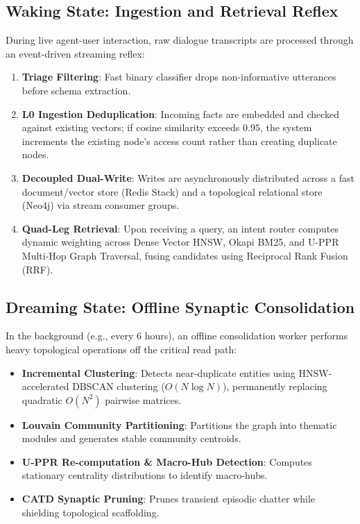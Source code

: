 \documentclass[conference]{IEEEtran}
\begin{document}
\subsection{Waking State: Ingestion and Retrieval Reflex}
During live agent-user interaction, raw dialogue transcripts are processed through an event-driven streaming reflex:
\begin{enumerate}
    \item \textbf{Triage Filtering}: Fast binary classifier drops non-informative utterances before schema extraction.
    \item \textbf{L0 Ingestion Deduplication}: Incoming facts are embedded and checked against existing vectors; if cosine similarity exceeds $0.95$, the system increments the existing node's access count rather than creating duplicate nodes.
    \item \textbf{Decoupled Dual-Write}: Writes are asynchronously distributed across a fast document/vector store (Redis Stack) and a topological relational store (Neo4j) via stream consumer groups.
    \item \textbf{Quad-Leg Retrieval}: Upon receiving a query, an intent router computes dynamic weighting across Dense Vector HNSW, Okapi BM25, and U-PPR Multi-Hop Graph Traversal, fusing candidates using Reciprocal Rank Fusion (RRF).
\end{enumerate}

\subsection{Dreaming State: Offline Synaptic Consolidation}
In the background (e.g., every 6 hours), an offline consolidation worker performs heavy topological operations off the critical read path:
\begin{itemize}
    \item \textbf{Incremental Clustering}: Detects near-duplicate entities using HNSW-accelerated DBSCAN clustering ($O(N \log N)$), permanently replacing quadratic $O(N^2)$ pairwise matrices.
    \item \textbf{Louvain Community Partitioning}: Partitions the graph into thematic modules and generates stable community centroids.
    \item \textbf{U-PPR Re-computation \& Macro-Hub Detection}: Computes stationary centrality distributions to identify macro-hubs.
    \item \textbf{CATD Synaptic Pruning}: Prunes transient episodic chatter while shielding topological scaffolding.
\end{itemize}
\end{document}
